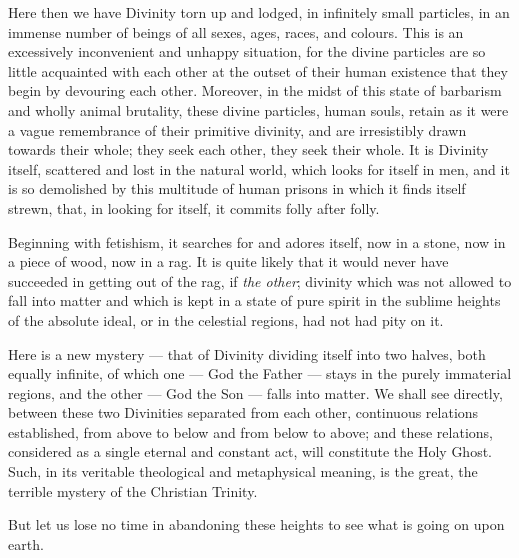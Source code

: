 \documentclass[12pt]{report}
\begin{document}
Here then we have Divinity torn up and lodged, in infinitely small particles, in an immense number of beings of all sexes, ages, races, and colours. This is an excessively inconvenient and unhappy situation, for the divine particles are so little acquainted with each other at the outset of their human existence that they begin by devouring each other. Moreover, in the midst of this state of barbarism and wholly animal brutality, these divine particles, human souls, retain as it were a vague remembrance of their primitive divinity, and are irresistibly drawn towards their whole; they seek each other, they seek their whole. It is Divinity itself, scattered and lost in the natural world, which looks for itself in men, and it is so demolished by this multitude of human prisons in which it finds itself strewn, that, in looking for itself, it commits folly after folly.


Beginning with fetishism, it searches for and adores itself, now in a stone, now in a piece of wood, now in a rag. It is quite likely that it would never have succeeded in getting out of the rag, if \emph{the other}; divinity which was not allowed to fall into matter and which is kept in a state of pure spirit in the sublime heights of the absolute ideal, or in the celestial regions, had not had pity on it.


Here is a new mystery — that of Divinity dividing itself into two halves, both equally infinite, of which one — God the Father — stays in the purely immaterial regions, and the other — God the Son — falls into matter. We shall see directly, between these two Divinities separated from each other, continuous relations established, from above to below and from below to above; and these relations, considered as a single eternal and constant act, will constitute the Holy Ghost. Such, in its veritable theological and metaphysical meaning, is the great, the terrible mystery of the Christian Trinity.


But let us lose no time in abandoning these heights to see what is going on upon earth.
\end{document}
